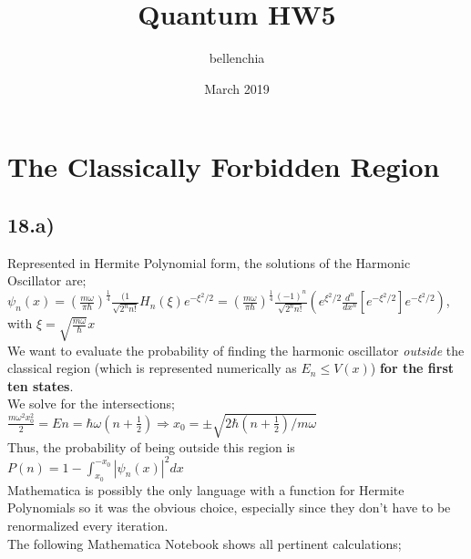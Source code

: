 \documentclass[12pt]{article}
\title{Quantum HW5}
\author{bellenchia}
\date{March 2019}
\begin{document}
\maketitle

\section*{The Classically Forbidden Region}
\subsection*{18.a)}
Represented in Hermite Polynomial form, the solutions of the Harmonic Oscillator are;\\

$\psi_n(x)=(\frac{m\omega}{\pi\hbar})^{\frac{1}{4}}\frac{(1}{\sqrt{2^nn!}}H_n(\xi)e^{-\xi^2/2}=(\frac{m\omega}{\pi\hbar})^{\frac{1}{4}}\frac{(-1)^n}{\sqrt{2^nn!}}(e^{\xi^2/2}\frac{d^n}{dx^n}[e^{-\xi^2/2}]e^{-\xi^2/2})$, with $\xi=\sqrt{\frac{m\omega}{\hbar}}x$\\


We want to evaluate the probability of finding the harmonic oscillator \textit{outside} the classical region (which is represented numerically as $E_n\leq V(x)$) \textbf{for the first ten states}.\\

We solve for the intersections; $ \frac{m\omega^2 x_0^2}{2}=En=\hbar\omega(n+\frac{1}{2})\Rightarrow x_0=\pm\sqrt{ 2\hbar(n+\frac{1}{2})/m\omega }$\\

Thus, the probability of being outside this region is $P(n)=1-{\displaystyle{\int_{x_0}^{-x_0}}}|\psi_n(x)|^2dx$\\

Mathematica is possibly the only language with a function for Hermite Polynomials so it was the obvious choice, especially since they don't have to be renormalized every iteration.\\

The following Mathematica Notebook shows all pertinent calculations;\\
\end{document}
